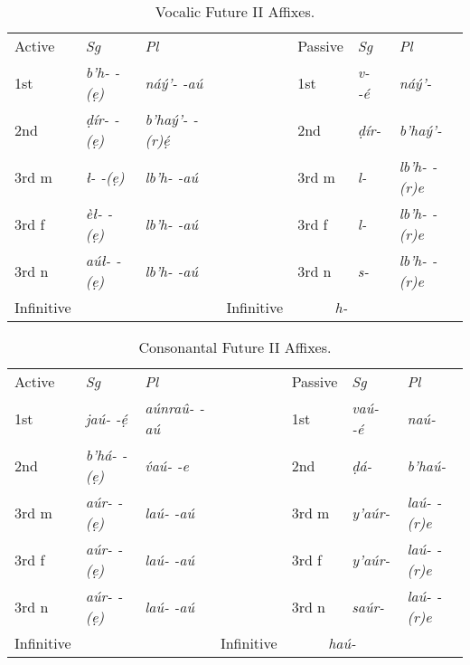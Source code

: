 \documentclass[a4paper, 12pt, oneside, final]{article}
\let \nf \normalfont
\def \d {ḍ}
\begin{document}
\begin{table}[H]
\centering
\noindent\begin{tabular}{@{}|>{}l|>{\it}l|>{\it}l|>{}l|>{}l|>{\it}l|>{\it}l|}\cline{1-3}\cline{5-7}
Active&\nf Sg&\nf Pl& & Passive&\nf Sg&\nf Pl\\\cline{1-3}\cline{5-7}
1st   &b’h- -(ẹ)  &náý’- -aú      &&1st    &v- -é    &náý’-       \\\cline{1-3}\cline{5-7}
2nd   &ḍír- -(ẹ)  &b’haý’- -(r)ẹ́  &&2nd    &ḍír-     &b’haý’-     \\\cline{1-3}\cline{5-7}
3rd m &ł-  -(ẹ)   &lb’h- -aú      &&3rd m  &l-       &lb’h- -(r)e \\\cline{1-3}\cline{5-7}
3rd f &èł-  -(ẹ)  &lb’h- -aú      &&3rd f  &l-       &lb’h- -(r)e \\\cline{1-3}\cline{5-7}
3rd n &aúł-  -(ẹ) &lb’h- -aú      &&3rd n  &s-       &lb’h- -(r)e \\\cline{1-3}\cline{5-7}
Infinitive&\multicolumn{2}{c|}{\it d- -è}&&Infinitive&\multicolumn{2}{c|}{\it h-}\\\cline{1-3}\cline{5-7}
\end{tabular}
\caption{Vocalic Future II Affixes.}\label{tab:future-2-vocalic}
\end{table}

\begin{table}[H]
\centering
\noindent\begin{tabular}{@{}|>{}l|>{\it}l|>{\it}l|>{}l|>{}l|>{\it}l|>{\it}l|}\cline{1-3}\cline{5-7}
Active&\nf Sg&\nf Pl& & Passive&\nf Sg&\nf Pl\\\cline{1-3}\cline{5-7}
1st   &jaú- -ẹ́  &aúnraû- -aú &&1st   &vaú- -é  &naú-       \\\cline{1-3}\cline{5-7}
2nd   &b’há- -(ẹ) &v́aú- -e     &&2nd   &\d{}á-  &b’haú-     \\\cline{1-3}\cline{5-7}
3rd m &aúr-  -(ẹ) &laú- -aú    &&3rd m &y’aúr-  &laú- -(r)e \\\cline{1-3}\cline{5-7}
3rd f &aúr-  -(ẹ) &laú- -aú    &&3rd f &y’aúr-  &laú- -(r)e \\\cline{1-3}\cline{5-7}
3rd n &aúr-  -(ẹ) &laú- -aú    &&3rd n &saúr-   &laú- -(r)e \\\cline{1-3}\cline{5-7}
Infinitive&\multicolumn{2}{c|}{\it dẹ- -è}&&Infinitive&\multicolumn{2}{c|}{\it haú-}\\\cline{1-3}\cline{5-7}
\end{tabular}
\caption{Consonantal Future II Affixes.}\label{tab:future-2-consonantal}
\end{table}
\end{document}
